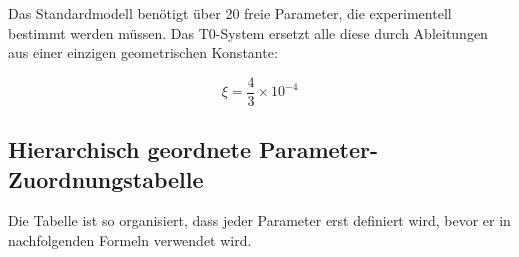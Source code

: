 \documentclass[12pt,a4paper]{article}
\theoremstyle{definition}
\begin{document}
Das Standardmodell benötigt über 20 freie Parameter, die experimentell bestimmt werden müssen. Das T0-System ersetzt alle diese durch Ableitungen aus einer einzigen geometrischen Konstante:

\begin{equation}
	\boxed{\xi = \frac{4}{3} \times 10^{-4}}
\end{equation}

\subsection{Hierarchisch geordnete Parameter-Zuordnungstabelle}
\label{subsec:hierarchical_mapping}

Die Tabelle ist so organisiert, dass jeder Parameter erst definiert wird, bevor er in nachfolgenden Formeln verwendet wird.
\end{document}
